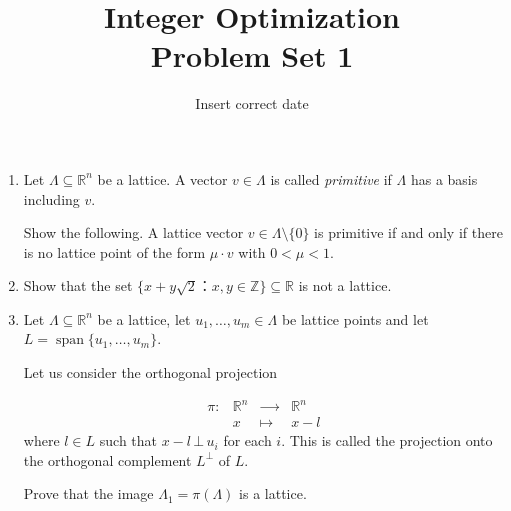 \documentclass[11pt,a4paper]{article}
\title{Integer Optimization  \\ Problem Set 1 }
\date{ Insert correct date}
\DeclareMathOperator{\Spa}{span}
\begin{document}
\maketitle 




\begin{enumerate} 
\item

  Let $Λ ⊆ ℝ^n$ be a lattice. A vector $v ∈ Λ$ is called \emph{primitive} if $Λ$ has a basis including $v$.

  \medskip

  Show the following. A lattice vector $v ∈ Λ \setminus \{0\}$ is primitive  if and only if there is no lattice point of the form $μ ⋅ v$ with $0<μ<1$.

\item Show that the set $ \{ x + y \sqrt{2} ： x,y ∈ ℤ \} ⊆ ℝ$ is not a lattice.

\item Let $Λ ⊆ ℝ^n$  be a lattice, let $u_1 ,\dots ,u_m  ∈ Λ$  be lattice points and let
  $ L = \Spa \{u_1, \dots , u_m\}$.


  Let us consider the orthogonal projection

  \begin{displaymath}
    \begin{array}{rccc}      
      π : & ℝ^ n &  ⟶ &  ℝ^ n \\
          & x & ↦       & x-l 
          \end{array}
        \end{displaymath}
where $l ∈ L$ such that  $x-l \, ⊥\,  u_i$ for each $i$.         
This is called the projection onto the orthogonal complement $L^⊥$ of $L$.

Prove that the image $Λ_1 = π(Λ)$  is a lattice.
  

  

\end{enumerate}



%
%


 
\end{document}
